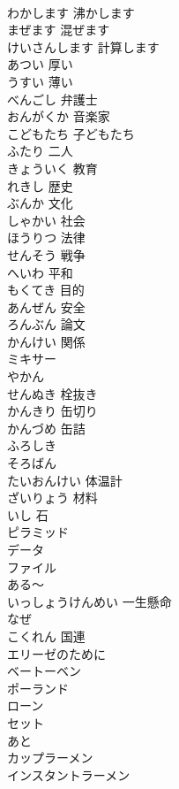 \documentclass[8pt]{extreport}
\begin{document}
\begin{CJK}{UTF8}{min}
\\	わかします	沸かします	
\\	まぜます	混ぜます	
\\	けいさんします	計算します	
\\	あつい	厚い	
\\	うすい	薄い	
\\	べんごし	弁護士	
\\	おんがくか	音楽家	
\\	こどもたち	子どもたち	
\\	ふたり	二人	
\\	きょういく	教育	
\\	れきし	歴史	
\\	ぶんか	文化	
\\	しゃかい	社会	
\\	ほうりつ	法律	
\\	せんそう	戦争	
\\	へいわ	平和	
\\	もくてき	目的	
\\	あんぜん	安全	
\\	ろんぶん	論文	
\\	かんけい	関係	
\\	ミキサー			
\\	やかん			
\\	せんぬき	栓抜き	
\\	かんきり	缶切り	
\\	かんづめ	缶詰	
\\	ふろしき			
\\	そろばん			
\\	たいおんけい	体温計	
\\	ざいりょう	材料	
\\	いし	石	
\\	ピラミッド			
\\	データ			
\\	ファイル			
\\	ある～			
\\	いっしょうけんめい	一生懸命	
\\	なぜ			
\\	こくれん	国連	
\\	エリーゼのために			
\\	ベートーベン			
\\	ポーランド			
\\	ローン			
\\	セット			
\\	あと			
\\	カップラーメン			
\\	インスタントラーメン			

\end{CJK}
\end{document}
